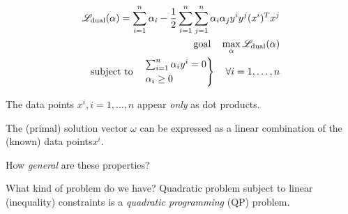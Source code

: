 
\begin{align*}
	\mathscr{L}_\text{dual}(\alpha) = \sum_{i=1}^n \alpha_i - \frac{1}{2} \sum_{i=1}^n \sum_{j=1}^n \alpha_i \alpha_j y^i y^j (x^i)^T x^j \\
	\text{goal} \quad \max_{\alpha} \mathscr{L}_\text{dual}(\alpha)                                                                       \\
	\text{subject to} \quad
	\begin{rcases*}
		\sum_{i=1}^n \alpha_i y^i = 0 \\
		\alpha_i \geq 0
	\end{rcases*} \quad \forall i=1,\dots,n
\end{align*}

\begin{note}{}{}
	The data points $x^i, i=1,\dots,n$  appear \emph{only} as
	dot products.
\end{note}

\begin{note}{}{}
	The (primal) solution vector $\omega$
	can be expressed as a linear combination of the (known) data points$x^i$.
\end{note}


\begin{question}{}{}
	How \emph{general} are these properties?
\end{question}

\begin{question}{What kind of problem do we have?}{}
	Quadratic problem subject to linear (inequality) constraints is
	a \emph{quadratic programming} (QP) problem.
\end{question}

